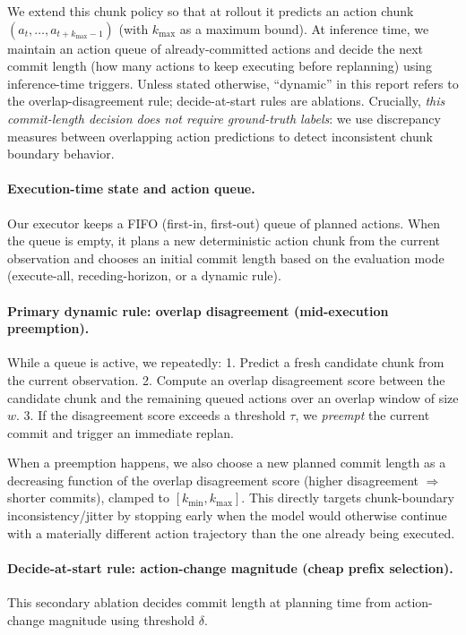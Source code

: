 \documentclass{article}
\begin{document}
We extend this chunk policy so that at rollout it predicts an action chunk $(a_t,\dots,a_{t+k_{\max}-1})$ (with $k_{\max}$ as a maximum bound). At inference time, we maintain an action queue of already-committed actions and decide the next commit length (how many actions to keep executing before replanning) using inference-time triggers. Unless stated otherwise, ``dynamic'' in this report refers to the overlap-disagreement rule; decide-at-start rules are ablations. Crucially, \emph{this commit-length decision does not require ground-truth labels}: we use discrepancy measures between overlapping action predictions to detect inconsistent chunk boundary behavior.

\paragraph{Execution-time state and action queue.}
Our executor keeps a FIFO (first-in, first-out) queue of planned actions. When the queue is empty, it plans a new deterministic action chunk from the current observation and chooses an initial commit length based on the evaluation mode (execute-all, receding-horizon, or a dynamic rule).

\paragraph{Primary dynamic rule: overlap disagreement (mid-execution preemption).}
While a queue is active, we repeatedly:
1. Predict a fresh candidate chunk from the current observation.
2. Compute an overlap disagreement score between the candidate chunk and the remaining queued actions over an overlap window of size $w$.
3. If the disagreement score exceeds a threshold $\tau$, we \emph{preempt} the current commit and trigger an immediate replan.

When a preemption happens, we also choose a new planned commit length as a decreasing function of the overlap disagreement score (higher disagreement $\Rightarrow$ shorter commits), clamped to $[k_{\min},k_{\max}]$. This directly targets chunk-boundary inconsistency/jitter by stopping early when the model would otherwise continue with a materially different action trajectory than the one already being executed.

\paragraph{Decide-at-start rule: action-change magnitude (cheap prefix selection).}
This secondary ablation decides commit length at planning time from action-change magnitude using threshold $\delta$.
\end{document}
